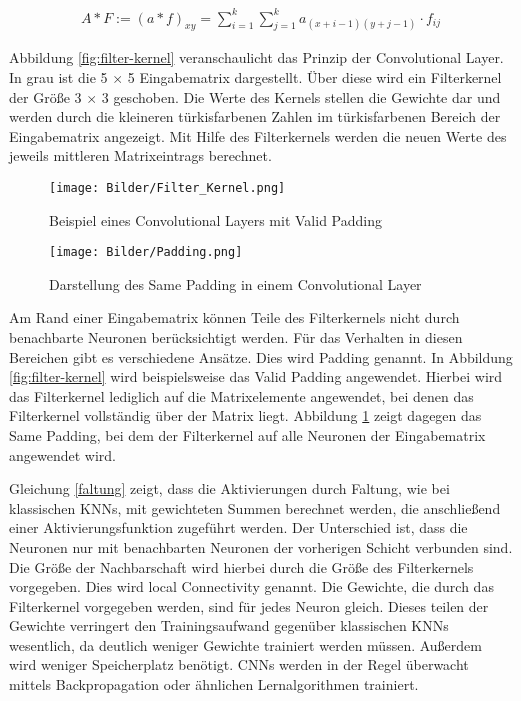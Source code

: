 \begin{align}
	A \ast F := (a \ast f)_{xy} = \sum_{i=1}^{k} \sum_{j=1}^{k} a_{(x+i-1)(y+j-1)} \cdot f_{ij}
	\label{faltung}
\end{align}

Abbildung \ref{fig:filter-kernel} veranschaulicht das Prinzip der Convolutional Layer. In grau ist die 5 $\times$ 5 Eingabematrix dargestellt. Über diese wird ein Filterkernel der Größe 3 $\times$ 3 geschoben. Die Werte des Kernels stellen die Gewichte dar und werden durch die kleineren türkisfarbenen Zahlen im türkisfarbenen Bereich der Eingabematrix angezeigt. Mit Hilfe des Filterkernels werden die neuen Werte des jeweils mittleren Matrixeintrags berechnet. 

\begin{figure}
	\centering
	\begin{minipage}[t]{0.45\linewidth}
		\centering
		\texttt{[image: Bilder/Filter\_Kernel.png]}
		\caption{Beispiel eines Convolutional Layers mit Valid Padding}
		\label{fig:filter-kernel}
	\end{minipage}
	\hfill
	\begin {minipage}[t]{0.45\linewidth}
		\centering
    		\texttt{[image: Bilder/Padding.png]}
    		\caption{Darstellung des Same Padding in einem Convolutional Layer}
    		\label{fig:padding}
	\end{minipage}
\end{figure}

Am Rand einer Eingabematrix können Teile des Filterkernels nicht durch benachbarte Neuronen berücksichtigt werden. Für das Verhalten in diesen Bereichen gibt es verschiedene Ansätze. Dies wird Padding genannt. In Abbildung \ref{fig:filter-kernel} wird bei\-spiels\-wei\-se das Valid Padding angewendet. Hierbei wird das Filterkernel lediglich auf die Matrixelemente angewendet, bei denen das Filterkernel vollständig über der Matrix liegt. Abbildung \ref{fig:padding} zeigt dagegen das Same Padding, bei dem der Filterkernel auf alle Neuronen der Eingabematrix angewendet wird. 

Gleichung \eqref{faltung} zeigt, dass die Aktivierungen durch Faltung, wie bei klassischen KNNs, mit gewichteten Summen berechnet werden, die anschließend einer Aktivierungsfunktion zugeführt werden. Der Unterschied ist, dass die Neuronen nur mit benachbarten Neuronen der vorherigen Schicht verbunden sind. Die Größe der Nachbarschaft wird hierbei durch die Größe des Filterkernels vorgegeben. Dies wird local Connectivity genannt. Die Gewichte, die durch das Filterkernel vorgegeben werden, sind für jedes Neuron gleich. Dieses teilen der Gewichte verringert den Trainingsaufwand gegenüber klassischen KNNs wesentlich, da deutlich weniger Gewichte trainiert werden müssen. Außerdem wird weniger Speicherplatz benötigt. CNNs werden in der Regel überwacht mittels Backpropagation oder ähnlichen Lernalgorithmen trainiert. 

